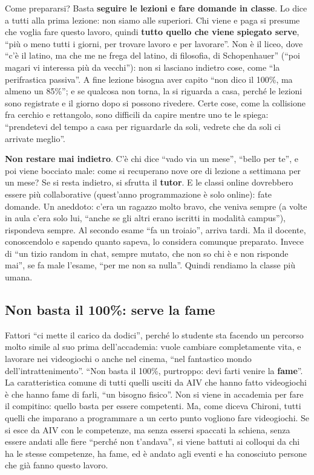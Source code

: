 Come prepararsi? Basta \textbf{seguire le lezioni e fare domande in classe}.
Lo dice a tutti alla prima lezione: non siamo alle superiori. Chi viene e paga
si presume che voglia fare questo lavoro, quindi \textbf{tutto quello che
viene spiegato serve}, ``più o meno tutti i giorni, per trovare lavoro e per
lavorare''. Non è il liceo, dove ``c'è il latino, ma che me ne frega del
latino, di filosofia, di Schopenhauer'' (``poi magari vi interessa più da
vecchi''): non si lasciano indietro cose, come ``la perifrastica passiva''. A
fine lezione bisogna aver capito ``non dico il 100\%, ma almeno un 85\%''; e
se qualcosa non torna, la si riguarda a casa, perché le lezioni sono
registrate e il giorno dopo si possono rivedere. Certe cose, come la
collisione fra cerchio e rettangolo, sono difficili da capire mentre uno te le
spiega: ``prendetevi del tempo a casa per riguardarle da soli, vedrete che da
soli ci arrivate meglio''.

\textbf{Non restare mai indietro}. C'è chi dice ``vado via un mese'', ``bello
per te'', e poi viene bocciato male: come si recuperano nove ore di lezione a
settimana per un mese? Se si resta indietro, si sfrutta il \textbf{tutor}. E
le classi online dovrebbero essere più collaborative (quest'anno
programmazione è solo online): fate domande. Un aneddoto: c'era un ragazzo
molto bravo, che veniva sempre (a volte in aula c'era solo lui, ``anche se gli
altri erano iscritti in modalità campus''), rispondeva sempre. Al secondo
esame ``fa un troiaio'', arriva tardi. Ma il docente, conoscendolo e sapendo
quanto sapeva, lo considera comunque preparato. Invece di ``un tizio random in
chat, sempre mutato, che non so chi è e non risponde mai'', se fa male
l'esame, ``per me non sa nulla''. Quindi rendiamo la classe più umana.

\subsection{Non basta il 100\%: serve la fame}

Fattori ``ci mette il carico da dodici'', perché lo studente sta facendo un
percorso molto simile al suo prima dell'accademia: vuole cambiare
completamente vita, e lavorare nei videogiochi o anche nel cinema, ``nel
fantastico mondo dell'intrattenimento''. ``Non basta il 100\%, purtroppo:
devi farti venire la \textbf{fame}''. La caratteristica comune di tutti quelli
usciti da AIV che hanno fatto videogiochi è che hanno fame di farli, ``un
bisogno fisico''. Non si viene in accademia per fare il compitino: quello basta
per essere competenti. Ma, come diceva Chironi, tutti quelli che imparano a
programmare a un certo punto vogliono fare videogiochi. Se si esce da AIV con
le competenze, ma senza essersi spaccati la schiena, senza essere andati alle
fiere ``perché non t'andava'', si viene battuti ai colloqui da chi ha le stesse
competenze, ha fame, ed è andato agli eventi e ha conosciuto persone che già
fanno questo lavoro.

